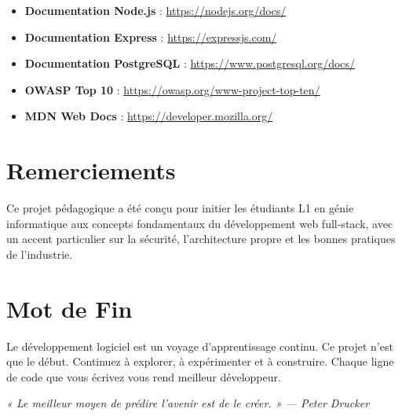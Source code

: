 \begin{itemize}
    \item \textbf{Documentation Node.js} : \url{https://nodejs.org/docs/}
    \item \textbf{Documentation Express} : \url{https://expressjs.com/}
    \item \textbf{Documentation PostgreSQL} : \url{https://www.postgresql.org/docs/}
    \item \textbf{OWASP Top 10} : \url{https://owasp.org/www-project-top-ten/}
    \item \textbf{MDN Web Docs} : \url{https://developer.mozilla.org/}
\end{itemize}

\section{Remerciements}

Ce projet pédagogique a été conçu pour initier les étudiants L1 en génie informatique aux concepts fondamentaux du développement web full-stack, avec un accent particulier sur la sécurité, l'architecture propre et les bonnes pratiques de l'industrie.

\section{Mot de Fin}

Le développement logiciel est un voyage d'apprentissage continu. Ce projet n'est que le début. Continuez à explorer, à expérimenter et à construire. Chaque ligne de code que vous écrivez vous rend meilleur développeur.

\textit{« Le meilleur moyen de prédire l'avenir est de le créer. » — Peter Drucker}

